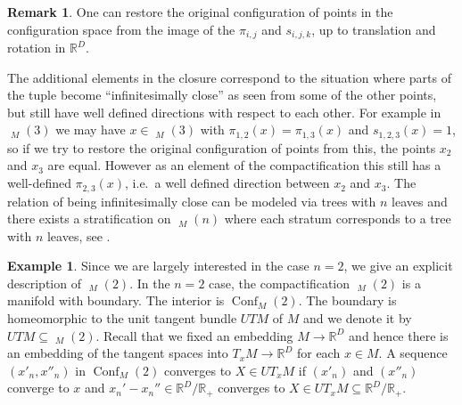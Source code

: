 \documentclass{scrartcl}
\theoremstyle{plain}
\theoremstyle{definition}
\newtheorem{example}[theorem]{Example}
\newtheorem{remark}[theorem]{Remark}
\newcommand{\R}{\mathbb R}
\renewcommand{\subset}{\subseteq}
\DeclareMathOperator{\Conf}{Conf}
\DeclareMathOperator{\cConf}{\overline{Conf}}
\begin{document}
\begin{remark}
    One can restore the original configuration of points in the configuration space from the image of the $\pi_{i,j}$ and $s_{i,j,k}$, up to translation and rotation in $\R^D$.

    The additional elements in the closure correspond to the situation where parts of the tuple become ``infinitesimally close'' as seen from some of the other points, but still have well defined directions with respect to each other. For example in $\cConf_M(3)$ we may have $x\in \cConf_M(3)$ with $\pi_{1,2}(x) = \pi_{1,3}(x)$ and $s_{1,2,3}(x)= 1$, so if we try to restore the original configuration of points from this, the points $x_2$ and $x_3$ are equal. However as an element of the compactification this still has a well-defined $\pi_{2,3}(x)$, i.e.\ a well defined direction between $x_2$ and $x_3$. The relation of being infinitesimally close can be modeled via trees with $n$ leaves and there exists a stratification on $\cConf_M(n)$ where each stratum corresponds to a tree with $n$ leaves, see \cite{sinha2004manifold}. 
\end{remark}

\begin{example}\label{ex:conf-2}
    Since we are largely interested in the case $n=2$, we give an explicit description of $\cConf_M(2)$. In the $n=2$ case, the compactification $\cConf_M(2)$ is a manifold with boundary. The interior is $\Conf_M(2)$. The boundary is homeomorphic to the unit tangent bundle $UTM$ of $M$ and we denote it by  $UTM\subset\cConf_M(2)$. Recall that we fixed an embedding $M\to \R^D$ and hence there is an embedding of the tangent spaces into $T_xM\to\R^D$ for each $x\in M$. A sequence $(x'_n, x''_n)$ in $\Conf_M(2)$ converges to $X\in UT_xM$ if $(x'_n)$ and $(x''_n)$ converge to $x$ and $x_n'-x_n''\in \R^D/ \R_+$ converges to $X\in UT_xM\subset\R^D/\R_+$. 
\end{example}

\end{document}
